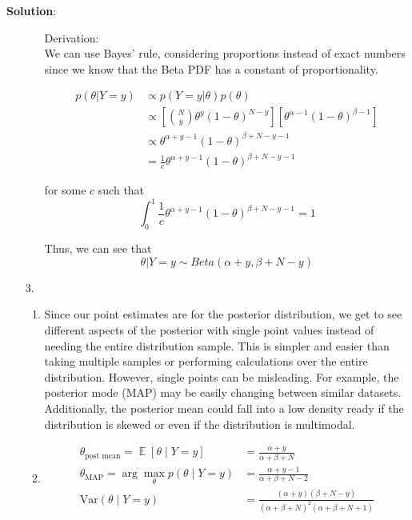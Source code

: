 \documentclass[submit]{../harvardml}
\newenvironment{answer}{
    \vspace{2mm}
    \color{blue}\noindent\textbf{Solution}:
}{}
\DeclareMathOperator*{\mean}{\mathbb{E}}
\begin{document}
\begin{answer}
\begin{enumerate}
\begin{enumerate}
              Derivation: \\

              We can use Bayes' rule, considering proportions instead of exact numbers since we know that the Beta PDF has a constant of proportionality.

              \begin{align*}
                  p(\theta | Y=y) &\propto p(Y=y | \theta)p(\theta) \\
                  &\propto \left[\binom{N}{y}\theta^y (1-\theta)^{N-y}\right]\left[\theta^{\alpha-1}(1-\theta)^{\beta - 1}\right] \\
                  &\propto \theta^{\alpha + y - 1}(1-\theta)^{\beta + N - y - 1}
                  \\
                  &= \frac{1}{c}\theta^{\alpha + y - 1}(1-\theta)^{\beta + N - y - 1}
              \end{align*}

              for some $c$ such that
              \[
              \int_{0}^1 \frac{1}{c}\theta^{\alpha + y - 1}(1-\theta)^{\beta + N - y - 1} = 1
              \]

              Thus, we can see that
              \[
              \theta | Y=y \sim Beta(\alpha + y, \beta + N - y)
              \]

      \end{enumerate}

    \item[3.]

      \begin{enumerate}
        \item
        Since our point estimates are for the posterior distribution, we get to see different aspects of the posterior with single point values instead of needing the entire distribution sample. This is simpler and easier than taking multiple samples or performing calculations over the entire distribution. However, single points can be misleading. For example, the posterior mode (MAP) may be easily changing between similar datasets. Additionally, the posterior mean could fall into a low density ready if the distribution is skewed or even if the distribution is multimodal.

        \item
              \begin{align*}
                \theta_{\text{post mean}} = \mean [\theta \mid Y = y]     & = \frac{\alpha + y}{\alpha + \beta + N}\\
                \theta_{\text{MAP}} =\arg \max_{\theta}p(\theta \mid Y=y) & = \frac{\alpha + y -1}{\alpha + \beta + N - 2}\\
                \mathrm{Var}(\theta \mid Y = y)                           & = \frac{(\alpha + y)(\beta + N - y)}{(\alpha + \beta + N)^2(\alpha + \beta + N + 1)}
              \end{align*}


\end{enumerate}
\end{enumerate}
\end{answer}
\end{document}
